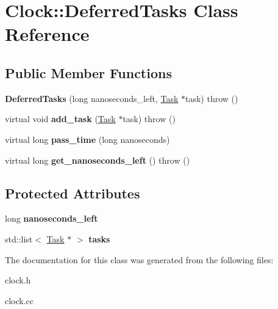 \hypertarget{classClock_1_1DeferredTasks}{
\section{Clock::DeferredTasks Class Reference}
\label{classClock_1_1DeferredTasks}
}
\subsection*{Public Member Functions}
\begin{DoxyCompactItemize}
\item 
\hypertarget{classClock_1_1DeferredTasks_a926f31c0c8b373d47f2ec84d6ecb8456}{
{\bfseries DeferredTasks} (long nanoseconds\_\-left, \hyperlink{classTask}{Task} $\ast$task)  throw ()}
\label{classClock_1_1DeferredTasks_a926f31c0c8b373d47f2ec84d6ecb8456}

\item 
\hypertarget{classClock_1_1DeferredTasks_a9f15b2b4d25c7d5234b1b4bc59bdac44}{
virtual void {\bfseries add\_\-task} (\hyperlink{classTask}{Task} $\ast$task)  throw ()}
\label{classClock_1_1DeferredTasks_a9f15b2b4d25c7d5234b1b4bc59bdac44}

\item 
\hypertarget{classClock_1_1DeferredTasks_a83c3a88b111e960cdcba261f3ab1c969}{
virtual long {\bfseries pass\_\-time} (long nanoseconds)}
\label{classClock_1_1DeferredTasks_a83c3a88b111e960cdcba261f3ab1c969}

\item 
\hypertarget{classClock_1_1DeferredTasks_ab5ebba44377bd518949bd6f93599c0c1}{
virtual long {\bfseries get\_\-nanoseconds\_\-left} ()  throw ()}
\label{classClock_1_1DeferredTasks_ab5ebba44377bd518949bd6f93599c0c1}

\end{DoxyCompactItemize}
\subsection*{Protected Attributes}
\begin{DoxyCompactItemize}
\item 
\hypertarget{classClock_1_1DeferredTasks_a6db5d7ddd158bef346c20a9792b57f3f}{
long {\bfseries nanoseconds\_\-left}}
\label{classClock_1_1DeferredTasks_a6db5d7ddd158bef346c20a9792b57f3f}

\item 
\hypertarget{classClock_1_1DeferredTasks_a17581b0d310a9d7ca041d50698edaeff}{
std::list$<$ \hyperlink{classTask}{Task} $\ast$ $>$ {\bfseries tasks}}
\label{classClock_1_1DeferredTasks_a17581b0d310a9d7ca041d50698edaeff}

\end{DoxyCompactItemize}


The documentation for this class was generated from the following files:\begin{DoxyCompactItemize}
\item 
clock.h\item 
clock.cc\end{DoxyCompactItemize}
